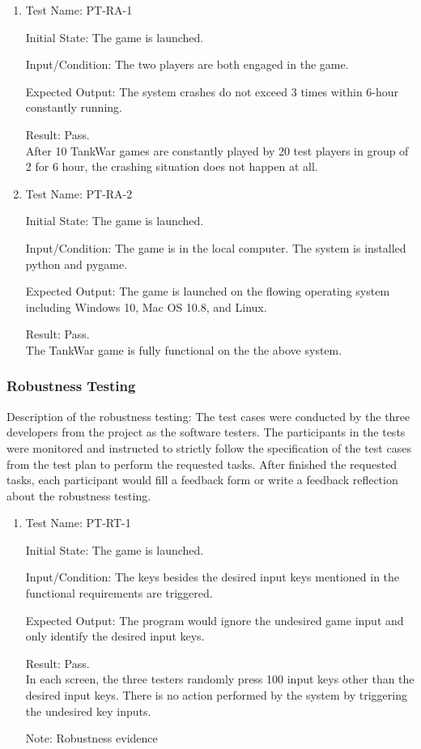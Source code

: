 \documentclass[12pt, titlepage]{article}
\begin{document}
\begin{enumerate}

\item{Test Name: PT-RA-1\\}

Initial State: The game is launched.

Input/Condition: The two players are both engaged in the game.

Expected Output: The system crashes do not exceed 3 times within 6-hour constantly running.

Result: Pass. \\After 10 TankWar games are constantly played by 20 test players in group of 2 for 6 hour, the crashing situation does not happen at all.

\item{Test Name: PT-RA-2\\}

Initial State: The game is launched.

Input/Condition: The game is in the local computer. The system is installed python and pygame.

Expected Output: The game is launched on the flowing operating system including Windows 10, Mac OS 10.8, and Linux.

Result: Pass. \\The TankWar game is fully functional on the the above system.

\end{enumerate}

\subsubsection{Robustness Testing}
Description of the robustness testing: The test cases were conducted by the three developers from the project as the software testers. The participants in the tests were monitored and instructed to strictly follow the specification of the test cases from the test plan to perform the requested tasks. After finished the requested tasks, each participant would fill a feedback form or write a feedback reflection about the robustness testing.

\begin{enumerate}

\item{Test Name: PT-RT-1\\}

Initial State: The game is launched.

Input/Condition: The keys besides the desired input keys mentioned in the functional requirements are triggered.

Expected Output: The program would ignore the undesired game input and only identify the desired input keys.

Result: Pass. \\In each screen, the three testers randomly press 100 input keys other than the desired input keys. There is no action performed by the system by triggering the undesired key inputs.

Note: Robustness evidence
\end{enumerate}
\end{document}
